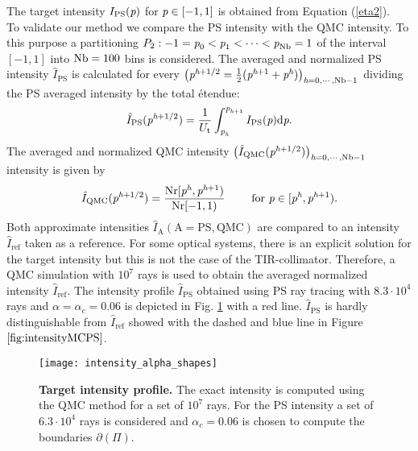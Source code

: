The target intensity $I_{\textrm{PS}}(\textit{p})$ for $\textit{p}\in[-1,1]$ is obtained from Equation (\ref{eta2}). \\ \indent
To validate our method we compare the PS intensity with the QMC intensity. 
To this purpose a partitioning $P_2:-1=\textit{p}_{0}<\textit{p}_1<\cdots<\textit{p}_{\textrm{Nb}}=1$ of the interval $[-1,1]$ into $\textrm{Nb}=100$ bins is considered. 
The averaged and normalized PS intensity $\hat{I}_{\textrm{PS}}$ is calculated for every 
$\big(\textit{p}^{\textit{h}+1/2} = \frac{1}{2}(\textit{p}^{\textit{h}+1}+ \textit{p}^{\textit{h}})\big)_{\textit{h}=0, \cdots, \textrm{Nb}-1}$ dividing the PS averaged intensity by the total \'{e}tendue:
\begin{equation}\label{eq:normalized_PS_intensity}
\hat{I}_{\textrm{PS}}(\textit{p}^{\textit{h}+1/2}) = \frac{1}{U_{\textrm{t}}}\int_{\textit{p}_{\textit{h}}}^{\textit{p}_{\textit{h}+1}} I_{\textrm{PS}}(\textit{p})\textrm{d}\textit{p}.
\end{equation}
The averaged and normalized QMC intensity $\big(\hat{I}_{\textrm{QMC}}(\textit{p}^{\textit{h}+1/2})\big)_{\textit{h} = 0, \cdots, \textrm{Nb}-1}$ intensity is given by
\begin{equation}\label{eq:normalized_MC_intensity}
\hat{I}_{\textrm{QMC}}(\textit{p}^{\textit{h}+1/2}) = \frac{\textrm{Nr}[\textit{p}^{\textit{h}},\textit{p}^{\textit{h}+1})}{\textrm{Nr}[-1,1)} 
\qquad \mbox{ for } \textit{p}\in[\textit{p}^{\textit{h}}, \textit{p}^{\textit{h}+1}).
\end{equation} 
Both approximate intensities $\hat{I}_{\textrm{A}} (\textrm{A} = \textrm{PS}, \textrm{QMC})$ are compared to an intensity $\hat{I}_{\textrm{ref}}$ taken as a reference. For some optical systems, there is an explicit solution for the target intensity but this is not the case of the TIR-collimator.
Therefore, a QMC simulation with $10^7$ rays is used to obtain the averaged normalized intensity $\hat{I}_{\textrm{ref}}$.
The intensity profile $\hat{I}_{\textrm{PS}}
$ obtained using PS ray tracing with $8.3\cdot 10^4$ rays and $\alpha= \alpha_c = 0.06$ is depicted in Fig. \ref{fig:intensityMCPS} with a red line.
$\hat{I}_{\textrm{PS}}$ is hardly distinguishable from $\hat{I}_{\textrm{ref}}$ showed with the dashed and blue line in Figure $\ref{fig:intensityMCPS}$.\\ \indent
  \begin{figure}[h]
    \centering
    \texttt{[image: intensity\_alpha\_shapes]}
\caption{\textbf{Target intensity profile.}
The exact intensity is computed using the QMC method for a set of $10^7$ rays. For the PS intensity a set of $6.3\cdot 10^4$
rays is considered and $\alpha_c = 0.06$ is chosen to compute the boundaries $\partial$$(\Pi)$.}
  \label{fig:intensityMCPS}
\end{figure}
